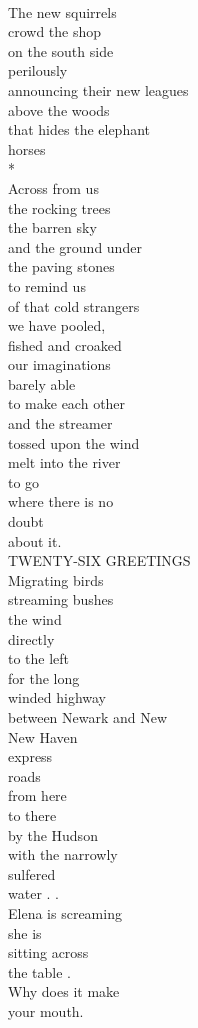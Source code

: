 \documentclass[smalldemyvopaper,11pt,twoside,onecolumn,openright,extrafontsizes]{memoir}
\begin{document}
\\The new squirrels
\\crowd the shop
\\on the south side
\\perilously
\\announcing their new leagues
\\above the woods
\\that hides the elephant
\\horses
\\*
\\Across from us
\\the rocking trees
\\the barren sky
\\and the ground under
\\the paving stones
\\to remind us
\\of that cold strangers
\\we have pooled,
\\fished and croaked
\\our imaginations
\\barely able
\\to make each other
\\and the streamer
\\tossed upon the wind
\\melt into the river
\\to go
\\where there is no
\\doubt
\\about it.
\\TWENTY-SIX GREETINGS
\\Migrating birds
\\streaming bushes
\\the wind
\\directly
\\to the left
\\for the long
\\winded highway
\\between Newark and New
\\New Haven
\\express
\\roads
\\from here
\\to there
\\by the Hudson
\\with the narrowly
\\sulfered
\\water          .          .
\\Elena is screaming
\\she is
\\sitting across
\\the table          .
\\Why does it make
\\your mouth.
\end{document}
